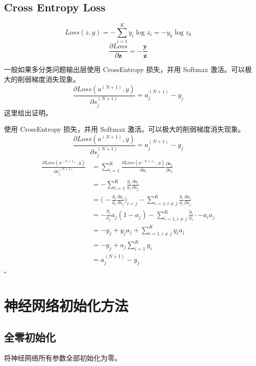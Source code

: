 \documentclass[UTF-8]{progbookcn}
\newenvironment{proof}{{\noindent\textbf{证明:}}}{\hfill $\square$\par}
\begin{document}
\subsection{Cross Entropy Loss\cite{DBLP:journals/corr/abs-1905-10626}}
\begin{equation}\label{2.2.1.3}
  Loss(z,y) = -\sum_{i=1}^{K}y_i\log z_i=-y_k\log z_k
\end{equation}
\begin{equation}\label{2.2.1.4}
  \frac{\partial Loss}{\partial \bm{z}} =-\frac{\bm{y}}{\bm{z}}
\end{equation}
\begin{keypoint}
  一般如果多分类问题输出层使用 CrossEntropy 损失，并用 Softmax 激活。可以极大的削弱梯度消失现象。
  \begin{equation}\label{E:Softmax+CE}
    \frac{\partial Loss(a^{(N+1)}, y)}{\partial s^{(N+1)}_j} = a^{(N+1)}_j -y_j
  \end{equation}
  这里给出证明。
\end{keypoint}

\begin{proof}使用 CrossEntropy 损失，并用 Softmax 激活。可以极大的削弱梯度消失现象。\\
  $$\frac{\partial Loss(a^{(N+1)}, y)}{\partial s^{(N+1)}_j} = a^{(N+1)}_j -y_j$$
  \begin{align*}
  \frac{\partial Loss(a^{(N+1)}, y)}{\partial s^{(N+1)}_j} & = \sum_{i=1}^{K} \frac{\partial Loss(a^{(N+1)}, y)}{\partial a_i}\frac{\partial a_i}{\partial s_j}\\
  & = -\sum_{i=1}^{K}\frac{y_i}{a_i}\frac{\partial a_i}{\partial s_j}\\
  &= \big(-\frac{y_i}{a_i}\frac{\partial a_i}{\partial s_j}\big)_{i=j}-\sum_{i=1,i\neq j}^{K}\frac{y_i}{a_i}\frac{\partial a_i}{\partial s_j}\\
  &= -\frac{y_j}{a_j}a_j(1-a_j)-\sum_{i=1,i\neq j}^{K}\frac{y_i}{a_i}\cdot -a_ia_j\\
  &=-y_j+y_ja_j+\sum_{i=1,i\neq j}^{K}y_ia_j\\
  & = -y_j+a_j\sum_{i=1}^{K}y_i\\
  & = a^{(N+1)}_j-y_j
\end{align*}
\end{proof}


\section{神经网络初始化方法}
\subsection{全零初始化}
\begin{keypoint}
将神经网络所有参数全部初始化为零。
\end{keypoint}
\end{document}
